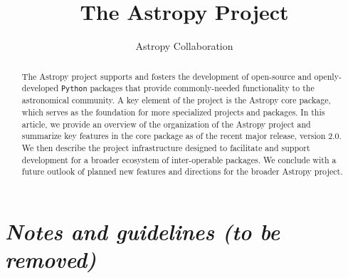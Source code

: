 \documentclass[modern]{aastex61}
\newcommand{\package}[1]{\texttt{#1}\xspace}
\newcommand{\python}{\package{Python}}
\newcommand{\astropy}{Astropy\xspace}
\begin{document}
\draft{\today}

\title{The Astropy Project}


\author{Astropy Collaboration}

\begin{abstract}
The \astropy project supports and fosters the development of open-source and openly-developed
\python packages that provide commonly-needed functionality to the astronomical
community.
A key element of the project is the \astropy core package, which serves as the
foundation for more specialized projects and packages.
In this article, we provide an overview of the organization of the \astropy
project and summarize key features in the core package as of the recent major
release, version 2.0.
We then describe the project infrastructure designed to facilitate and support
development for a broader ecosystem of inter-operable packages.
We conclude with a future outlook of planned new features and directions for the
broader \astropy project.
\end{abstract}

\keywords{}

\section*{\textit{Notes and guidelines (to be removed)}}
\end{document}

